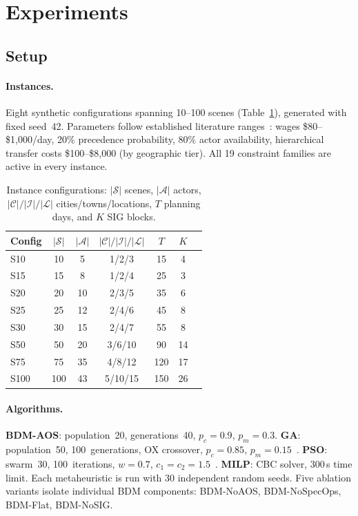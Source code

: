 \section{Experiments}
\label{sec:experiments}

\subsection{Setup}

\paragraph{Instances.}
Eight synthetic configurations spanning 10--100 scenes (Table~\ref{tab:instances}), generated with fixed seed~42.
Parameters follow established literature ranges~\citep{bomsdorf2008}: wages \$80--\$1{,}000/day, 20\% precedence probability, 80\% actor availability, hierarchical transfer costs \$100--\$8{,}000 (by geographic tier).
All 19 constraint families are active in every instance.

\begin{table}[t]
\centering
\caption{Instance configurations: $|\mathcal{S}|$ scenes, $|\mathcal{A}|$ actors,
         $|\mathcal{C}|/|\mathcal{I}|/|\mathcal{L}|$ cities/towns/locations,
         $T$ planning days, and $K$ SIG blocks.}
\label{tab:instances}
\small
\begin{tabular}{@{}lcccccc@{}}
\toprule
\textbf{Config} & $|\mathcal{S}|$ & $|\mathcal{A}|$ & $|\mathcal{C}|/|\mathcal{I}|/|\mathcal{L}|$ & $T$ & $K$ \\
\midrule
S10  & 10  & 5   & 1/2/3   & 15  & 4  \\
S15  & 15  & 8   & 1/2/4   & 25  & 3  \\
S20  & 20  & 10  & 2/3/5   & 35  & 6  \\
S25  & 25  & 12  & 2/4/6   & 45  & 8  \\
S30  & 30  & 15  & 2/4/7   & 55  & 8  \\
S50  & 50  & 20  & 3/6/10  & 90  & 14 \\
S75  & 75  & 35  & 4/8/12  & 120 & 17 \\
S100 & 100 & 43  & 5/10/15 & 150 & 26 \\
\bottomrule
\end{tabular}
\end{table}

\paragraph{Algorithms.}
\textbf{BDM-AOS}: population~20, generations~40, $p_c{=}0.9$, $p_m{=}0.3$.
\textbf{GA}: population~50, 100~generations, OX crossover, $p_c{=}0.85$, $p_m{=}0.15$~\citep{goncalves2011}.
\textbf{PSO}: swarm~30, 100~iterations, $w{=}0.7$, $c_1{=}c_2{=}1.5$~\citep{kennedy1995}.
\textbf{MILP}: CBC solver, 300\,s time limit.
Each metaheuristic is run with 30 independent random seeds.
Five ablation variants isolate individual BDM components: BDM-NoAOS, BDM-NoSpecOps, BDM-Flat, BDM-NoSIG.

